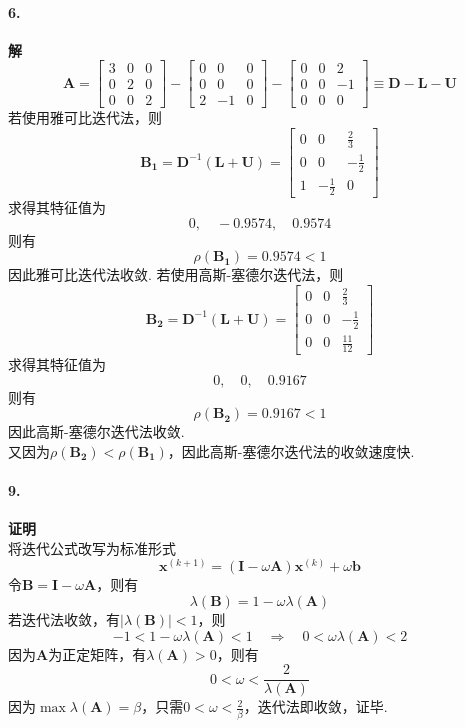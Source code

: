 \paragraph{6.} \textbf{解} \\
\[\mathbf{A} = \begin{bmatrix}
3 & 0 & 0\\
0 & 2 & 0\\ 
0 & 0 & 2
\end{bmatrix} - \begin{bmatrix}
0 & 0 & 0\\
0 & 0 & 0\\ 
2 & -1 & 0
\end{bmatrix} - \begin{bmatrix}
0 & 0 & 2\\
0 & 0 & -1\\ 
0 & 0 & 0
\end{bmatrix} \equiv \mathbf{D} - \mathbf{L} - \mathbf{U}\]
若使用雅可比迭代法，则
\[\mathbf{B_1} = \mathbf{D}^{-1}(\mathbf{L} + \mathbf{U}) = \begin{bmatrix}
0 & 0 & \frac{2}{3}\\
0 & 0 & -\frac{1}{2}\\ 
1 & -\frac{1}{2} & 0
\end{bmatrix}\]
求得其特征值为
\[0, \quad -0.9574, \quad 0.9574\]
则有
\[\rho(\mathbf{B_1}) = 0.9574 < 1\]
因此雅可比迭代法收敛.
若使用高斯-塞德尔迭代法，则
\[\mathbf{B_2} = \mathbf{D}^{-1}(\mathbf{L} + \mathbf{U}) = \begin{bmatrix}
0 & 0 & \frac{2}{3} \\
0 & 0 & -\frac{1}{2} \\ 
0 & 0 & \frac{11}{12}
\end{bmatrix}\]
求得其特征值为
\[0, \quad 0, \quad 0.9167\]
则有
\[\rho(\mathbf{B_2}) = 0.9167 < 1\]
因此高斯-塞德尔迭代法收敛. \\
又因为$\rho(\mathbf{B_2}) < \rho(\mathbf{B_1})$，因此高斯-塞德尔迭代法的收敛速度快.
\newline

\paragraph{9.} \textbf{证明} \\
将迭代公式改写为标准形式
\[\mathbf{x}^{(k + 1)} = (\mathbf{I} - \omega\mathbf{A}) \mathbf{x}^{(  k)} + \omega \mathbf{b}\]
令$\mathbf{B} = \mathbf{I} - \omega\mathbf{A}$，则有
\[\lambda(\mathbf{B}) = 1 - \omega \lambda(\mathbf{A})\]
若迭代法收敛，有$|\lambda(\mathbf{B})| < 1$，则
\[-1 < 1 - \omega \lambda(\mathbf{A}) < 1 \quad \Rightarrow \quad 0 < \omega\lambda(\mathbf{A}) < 2\]
因为$\mathbf{A}$为正定矩阵，有$\lambda(\mathbf{A}) > 0$，则有
\[0 < \omega < \frac{2}{\lambda(\mathbf{A})}\]
因为$\max \lambda(\mathbf{A}) = \beta$，只需$0 < \omega < \frac{2}{\beta}$，迭代法即收敛，证毕.


